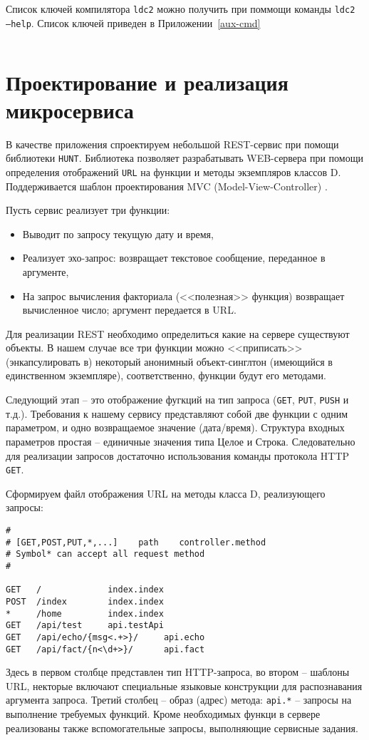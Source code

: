 \documentclass{studrep}
\begin{document}
Список ключей компилятора \texttt{ldc2} можно получить при поммощи команды \texttt{ldc2 --help}. Список ключей приведен в Приложении~\ref{aux-cmd}

\begin{verbatim}

\end{verbatim}

\chapter{Проектирование и реализация микросервиса}

В качестве приложения спроектируем небольшой REST-сервис при помощи библиотеки \texttt{HUNT}.  Библиотека позволяет разрабатывать WEB-сервера при помощи определения отображений \texttt{URL} на функции и методы экземпляров классов D.  Поддерживается шаблон проектирования MVC (Model-View-Controller) \cite{mvc}.

Пусть сервис реализует три функции:
\begin{itemize}
\item Выводит по запросу текущую дату и время,
\item Реализует эхо-запрос: возвращает текстовое сообщение, переданное в аргументе,
\item На запрос вычисления факториала (<<полезная>> функция) возвращает вычисленное число; аргумент передается в URL.
\end{itemize}

Для реализации REST необходимо определиться какие на сервере существуют объекты.  В нашем случае все три функции можно <<приписать>> (энкапсулировать в) некоторый анонимный объект-синглтон (имеющийся в единственном экземпляре), соответственно, функции будут его методами.

Следующий этап -- это отображение фугкций на тип запроса (\texttt{GET}, \texttt{PUT}, \texttt{PUSH} и т.д.).  Требования к нашему сервису представляют собой две функции с одним параметром, и одно возвращаемое значение (дата/время).  Структура входных параметров простая -- единичные значения типа Целое и Строка.  Следовательно для реализации запросов достаточно использования команды протокола HTTP \texttt{GET}.


Сформируем файл отображения URL на методы класса D, реализующего запросы:
\begin{verbatim}
#
# [GET,POST,PUT,*,...]    path    controller.method
# Symbol* can accept all request method
#

GET   /             index.index
POST  /index        index.index
*     /home         index.index
GET   /api/test     api.testApi
GET   /api/echo/{msg<.+>}/     api.echo
GET   /api/fact/{n<\d+>}/      api.fact
\end{verbatim}
Здесь в первом столбце представлен тип HTTP-запроса, во втором -- шаблоны URL, некторые включают специальные языковые конструкции для распознавания аргумента запроса. Третий столбец -- образ (адрес) метода: \texttt{api.*} -- запросы на выполнение требуемых функций.  Кроме необходимых функци в сервере реализованы также вспомогательные запросы, выполняющие сервисные задания.
\end{document}
